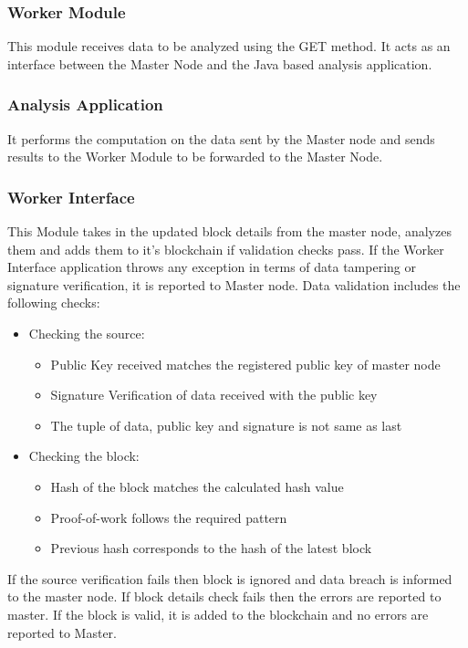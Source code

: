 \documentclass[10pt,journal,compsoc]{IEEEtran}
\begin{document}
\subsubsection{Worker Module}
This module receives data to be analyzed using the GET method. It acts as an interface between the Master Node and the Java based analysis application.

\subsubsection{Analysis Application}
It performs the computation on the data sent by the Master node and sends results to the Worker Module to be forwarded to the Master Node. 

\subsubsection{Worker Interface}
This Module takes in the updated block details from the master node, analyzes them and adds them to it's blockchain if validation checks pass. If the Worker Interface application throws any exception in terms of data tampering or signature verification, it is reported to Master node. Data validation includes the following checks:
\begin{itemize}
\item Checking the source:
\begin{itemize}
\item Public Key received matches the registered public key of master node
\item Signature Verification of data received with the public key
\item The tuple of data, public key and signature is not same as last
\end{itemize}
\item Checking the block:\
\begin{itemize}
\item Hash of the block matches the calculated hash value
\item Proof-of-work follows the required pattern
\item Previous hash corresponds to the hash of the latest block
\end{itemize}
\end{itemize}
If the source verification fails then block is ignored and data breach is informed to the master node. If block details check fails then the errors are reported to master. If the block is valid, it is added to the blockchain and no errors are reported to Master.\\
\end{document}

